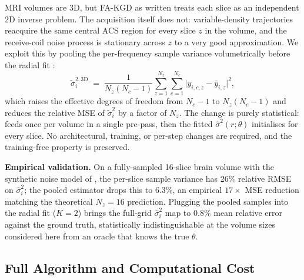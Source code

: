 \documentclass[10pt,twocolumn,letterpaper]{article}
\newcommand{\hatsig}{\hat{\sigma}}
\begin{document}
MRI volumes are 3D, but FA-KGD as written treats each slice as an
independent 2D inverse problem. The acquisition itself does not: variable-density
trajectories reacquire the same central ACS region for every slice $z$ in the
volume, and the receive-coil noise process is stationary across $z$ to a
very good approximation. We exploit this by pooling the per-frequency
sample variance volumetrically before the radial fit :
\begin{equation}
  \tilde\sigma_i^{2,\text{3D}} \;=\; \frac{1}{N_z(N_c-1)}
  \sum_{z=1}^{N_z}\sum_{c=1}^{N_c}
  \bigl|y_{i,c,z} - \bar y_{i,z}\bigr|^2,
  \label{eq:acs3d}
\end{equation}
which raises the effective degrees of freedom from $N_c{-}1$ to
$N_z(N_c{-}1)$ and reduces the relative MSE of $\tilde\sigma_i^2$ by a
factor of $N_z$. The change is purely statistical:  feeds
 once per volume in a single pre-pass, then the
fitted $\hatsig^2(r;\theta)$ initialises  for every slice.
No architectural, training, or per-step changes are required, and the
training-free property is preserved.

\textbf{Empirical validation.} On a fully-sampled 16-slice brain volume
with the synthetic noise model of , the per-slice
sample variance has 26\% relative RMSE on $\hatsig_i^2$; the pooled
estimator drops this to 6.3\%, an empirical $17\times$ MSE reduction
matching the theoretical $N_z\!=\!16$ prediction. Plugging the pooled
samples into the radial fit  ($K{=}2$) brings the
full-grid $\hatsig_i^2$ map to $0.8\%$ mean relative error against the
ground truth, statistically indistinguishable at the volume sizes
considered here from an oracle that knows the true $\theta$.

\subsection{Full Algorithm and Computational Cost}
\end{document}
